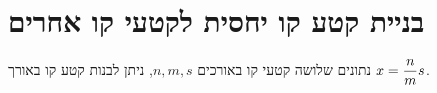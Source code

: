 

\section{בניית קטע קו יחסית לקטעי קו אחרים}\label{s.relative-straight}

\begin{theorem}\label{thm.three-lines}
נתונים שלושה קטעי קו באורכים
$n, m, s$,
ניתן לבנות קטע קו באורך
$x=\displaystyle\frac{n}{m}s$.
\end{theorem}

